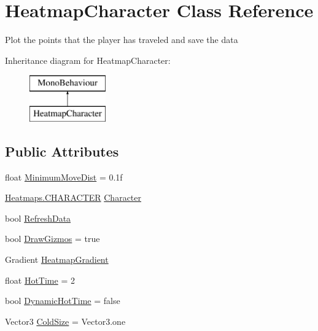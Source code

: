 \hypertarget{class_heatmap_character}{}\section{Heatmap\+Character Class Reference}
\label{class_heatmap_character}


Plot the points that the player has traveled and save the data  


Inheritance diagram for Heatmap\+Character\+:\begin{figure}[H]
\begin{center}
\leavevmode
\includegraphics[height=2.000000cm]{class_heatmap_character}
\end{center}
\end{figure}
\subsection*{Public Attributes}
\begin{DoxyCompactItemize}
\item 
float \mbox{\hyperlink{class_heatmap_character_a467908f41dcabca198bbb843a74e2ce6}{Minimum\+Move\+Dist}} = 0.\+1f
\item 
\mbox{\hyperlink{class_heatmaps_a257e4582d0ae682783bce271d444d42b}{Heatmaps.\+C\+H\+A\+R\+A\+C\+T\+ER}} \mbox{\hyperlink{class_heatmap_character_a169f22725aac4105f40b0621cd818de5}{Character}}
\item 
bool \mbox{\hyperlink{class_heatmap_character_a3b5bf7f91b2ba8f53cc0a48b1a58a453}{Refresh\+Data}}
\item 
bool \mbox{\hyperlink{class_heatmap_character_adf914a2914a6c25de3cac6244ac1365a}{Draw\+Gizmos}} = true
\item 
Gradient \mbox{\hyperlink{class_heatmap_character_a80d63811c54db8fd9564b9a2cbc775dd}{Heatmap\+Gradient}}
\item 
float \mbox{\hyperlink{class_heatmap_character_ad07f65edf0c75b3c5f2a0807a27164f2}{Hot\+Time}} = 2
\item 
bool \mbox{\hyperlink{class_heatmap_character_a3a40f0c4cd9ad16658deabcd73839b66}{Dynamic\+Hot\+Time}} = false
\item 
Vector3 \mbox{\hyperlink{class_heatmap_character_a3d691639044d6a827f1ac99d8aae892d}{Cold\+Size}} = Vector3.\+one
\end{DoxyCompactItemize}


